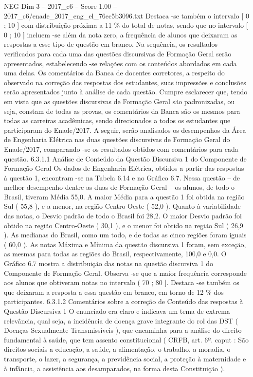\begin{textsample}{NEG Dim 3 – 2017\_c6 – Score 1.00 – 2017\_c6/enade\_2017\_eng\_el\_76ec5b3096.txt}
Destaca -se também o intervalo [ 0 ; 10 ] com distribuição próxima a 11 \% do total de notas, sendo que no intervalo [ 0 ; 10 ] incluem -se além da nota zero, a frequência de alunos que deixaram as respostas a esse tipo de questão em branco.
Na sequência, os resultados verificados para cada uma das questões discursivas de Formação Geral serão apresentados, estabelecendo -se relações com os conteúdos abordados em cada uma delas.
Os comentários da Banca de docentes corretores, a respeito do observado na correção das respostas dos estudantes, suas impressões e conclusões serão apresentados junto à análise de cada questão.
Cumpre esclarecer que, tendo em vista que as questões discursivas de Formação Geral são padronizadas, ou seja, constam de todas as provas, os comentários da Banca são os mesmos para todas as carreiras acadêmicas, sendo direcionados a todos os estudantes que participaram do Enade/2017.
A seguir, serão analisados os desempenhos da Área de Engenharia Elétrica nas duas questões discursivas de Formação Geral do Enade/2017, comparando -se os resultados obtidos com comentários para cada questão. 6.3.1.1 Análise de Conteúdo da Questão Discursiva 1 do Componente de Formação Geral Os dados de Engenharia Elétrica, obtidos a partir das respostas à questão 1, encontram -se na Tabela 6.14 e no Gráfico 6.7.
Nessa questão – de melhor desempenho dentre as duas de Formação Geral – os alunos, de todo o Brasil, tiveram Média 55,0.
A maior Média para a questão 1 foi obtida na região Sul ( 55,8 ), e a menor, na região Centro-Oeste ( 52,0 ).
Quanto à variabilidade das notas, o Desvio padrão de todo o Brasil foi 28,2.
O maior Desvio padrão foi obtido na região Centro-Oeste ( 30,1 ), e o menor foi obtido na região Sul ( 26,9 ).
As medianas do Brasil, como um todo, e de todas as cinco regiões foram iguais ( 60,0 ).
As notas Máxima e Mínima da questão discursiva 1 foram, sem exceção, as mesmas para todas as regiões do Brasil, respectivamente, 100,0 e 0,0.
O Gráfico 6.7 mostra a distribuição das notas na questão discursiva 1 do Componente de Formação Geral.
Observa -se que a maior frequência corresponde aos alunos que obtiveram notas no intervalo ( 70 ; 80 ].
Destaca -se também os que deixaram a resposta a essa questão em branco, em torno de 12 \% dos participantes. 6.3.1.2 Comentários sobre a correção de Conteúdo das respostas à Questão Discursiva 1 O enunciado era claro e indicava um tema de extrema relevância, qual seja, a incidência de doença grave integrante do rol das DST ( Doenças Sexualmente Transmissíveis ), que encaminha para a análise do direito fundamental à saúde, que tem assento constitucional ( CRFB, art. 6º. caput : São direitos sociais a educação, a saúde, a alimentação, o trabalho, a moradia, o transporte, o lazer, a segurança, a previdência social, a proteção à maternidade e à infância, a assistência aos desamparados, na forma desta Constituição ).

\end{textsample}
